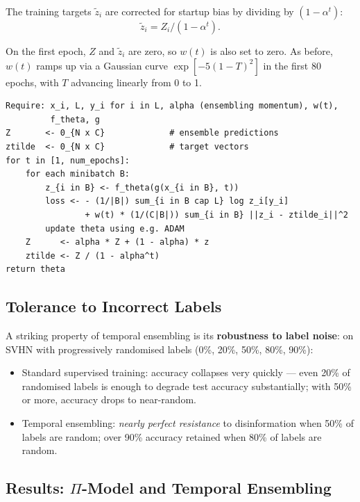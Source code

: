 \documentclass[11pt,a4paper]{article}
\theoremstyle{definition}
\theoremstyle{plain}
\theoremstyle{remark}
\begin{document}
The training targets $\widetilde{z}_i$ are corrected for startup bias by dividing by $(1-\alpha^t)$:
\begin{equation*}
    \widetilde{z}_i = Z_i / (1-\alpha^t).
\end{equation*}

On the first epoch, $Z$ and $\widetilde{z}_i$ are zero, so $w(t)$ is also set to zero. As before, $w(t)$ ramps up via a Gaussian curve $\exp[-5(1-T)^2]$ in the first 80 epochs, with $T$ advancing linearly from 0 to 1.

\begin{tcolorbox}[colback=gray!5!white,colframe=gray!60!black,title=\textbf{Algorithm 2: Temporal Ensembling}]
\begin{verbatim}
Require: x_i, L, y_i for i in L, alpha (ensembling momentum), w(t),
         f_theta, g
Z       <- 0_{N x C}             # ensemble predictions
ztilde  <- 0_{N x C}             # target vectors
for t in [1, num_epochs]:
    for each minibatch B:
        z_{i in B} <- f_theta(g(x_{i in B}, t))
        loss <- - (1/|B|) sum_{i in B cap L} log z_i[y_i]
                + w(t) * (1/(C|B|)) sum_{i in B} ||z_i - ztilde_i||^2
        update theta using e.g. ADAM
    Z      <- alpha * Z + (1 - alpha) * z
    ztilde <- Z / (1 - alpha^t)
return theta
\end{verbatim}
\end{tcolorbox}

\subsection{Tolerance to Incorrect Labels}

A striking property of temporal ensembling is its \textbf{robustness to label noise}: on SVHN with progressively randomised labels (0\%, 20\%, 50\%, 80\%, 90\%):
\begin{itemize}
    \item Standard supervised training: accuracy collapses very quickly --- even 20\% of randomised labels is enough to degrade test accuracy substantially; with 50\% or more, accuracy drops to near-random.
    \item Temporal ensembling: \emph{nearly perfect resistance} to disinformation when 50\% of labels are random; over 90\% accuracy retained when 80\% of labels are random.
\end{itemize}

\subsection{Results: $\Pi$-Model and Temporal Ensembling}
\end{document}
